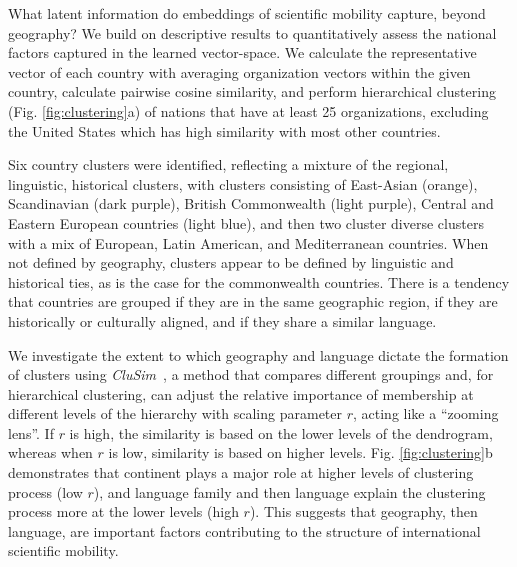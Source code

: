 \documentclass[12pt]{article} %
\begin{document}
What latent information do embeddings of scientific mobility capture, beyond geography? 
We build on descriptive results to quantitatively assess the national factors captured in the learned vector-space.
We calculate the representative vector of each country with averaging organization vectors within the given country, calculate pairwise cosine similarity, and perform hierarchical clustering (Fig. \ref{fig:clustering}a) of nations that have at least 25 organizations, excluding the United States which has high similarity with most other countries. 

Six country clusters were identified, reflecting a mixture of the regional, linguistic, historical clusters, with clusters consisting of East-Asian (orange), Scandinavian (dark purple), British Commonwealth (light purple), Central and Eastern European countries (light blue), and then two cluster diverse clusters with a mix of European, Latin American, and Mediterranean countries.
When not defined by geography, clusters appear to be defined by linguistic and historical ties, as is the case for the commonwealth countries. 
There is a tendency that countries are grouped if they are in the same geographic region, if they are historically or culturally aligned, and if they share a similar language. 

We investigate the extent to which geography and language dictate the formation of clusters using \textit{CluSim}~\autocite{gates2019element}, a method that compares different groupings and, for hierarchical clustering, can adjust the relative importance of membership at different levels of the hierarchy with scaling parameter $r$, acting like a ``zooming lens''.  
If $r$ is high, the similarity is based on the lower levels of the dendrogram, whereas when $r$ is low, similarity is based on higher levels. 
Fig. \ref{fig:clustering}b demonstrates that continent plays a major role at higher levels of clustering process (low $r$), and language family and then language explain the clustering process more at the lower levels (high $r$). 
This suggests that geography, then language, are important factors contributing to the structure of international scientific mobility.
\end{document}

